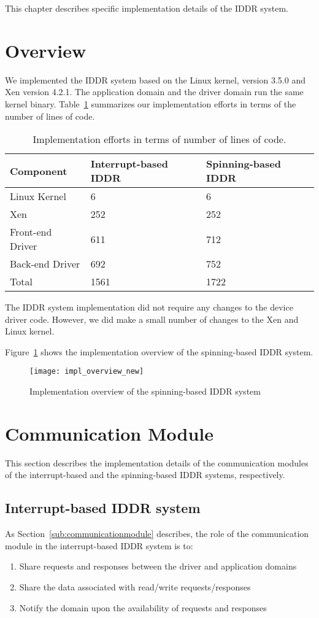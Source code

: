 This chapter describes specific implementation details of the IDDR system.

\section{Overview} 
We implemented the IDDR system based on the Linux kernel, version 3.5.0 and
Xen version 4.2.1. The application domain and the driver domain run the same kernel
binary. Table~\ref{tab:base} summarizes our implementation efforts in
terms of the number of lines of code.

\begin{table}
\caption{Implementation efforts in terms of number of lines of code.}
\begin{center}
\begin{tabular}{lll}
  \hline
  \label{tab:base}
  Component & Interrupt-based IDDR & Spinning-based IDDR \\
  \hline
  Linux Kernel & 6 & 6\\
  Xen & 252 & 252\\
  Front-end Driver & 611 & 712\\
  Back-end Driver & 692 & 752\\
  \hline 
  Total & 1561 & 1722\\
  \hline
\end{tabular}
\end{center}
\end{table}

The IDDR system implementation did not require any changes to the device
driver code. However, we did make a small number of changes to the Xen
and Linux kernel.

Figure~\ref{fig:Implementation overview} shows the implementation overview of 
the spinning-based IDDR system.

\begin{figure}[!ht]
\centering
\texttt{[image: impl\_overview\_new]}
\caption{Implementation overview of the spinning-based IDDR system}
\label{fig:Implementation overview}
\end{figure}

\section{Communication Module}
This section describes the implementation details of the communication
modules of the interrupt-based and the spinning-based IDDR systems, respectively.

\subsection{Interrupt-based IDDR system}
As Section~\ref{sub:communicationmodule} describes, the role of the communication module in the interrupt-based IDDR system is to:
\begin{enumerate} 
\item Share requests and responses between the driver and application domains
\item Share the data associated with read/write requests/responses
\item Notify the domain upon the availability of requests and responses 
\end{enumerate}
